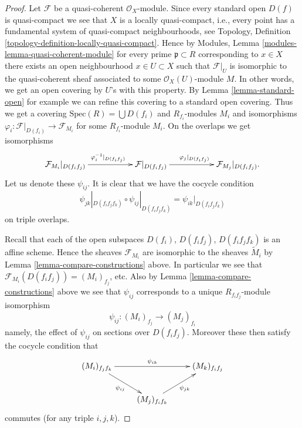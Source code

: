 \begin{proof}
Let $\mathcal{F}$ be a quasi-coherent $\mathcal{O}_X$-module.
Since every standard open $D(f)$ is quasi-compact we see that
$X$ is a locally quasi-compact, i.e., every point has a fundamental
system of quasi-compact neighbourhoods, see Topology,
Definition \ref{topology-definition-locally-quasi-compact}.
Hence by Modules, Lemma \ref{modules-lemma-quasi-coherent-module}
for every prime $\mathfrak p \subset R$ corresponding to $x \in X$
there exists an open neighbourhood $x \in U \subset X$ such that
$\mathcal{F}|_U$ is isomorphic to the quasi-coherent
sheaf associated to some $\mathcal{O}_X(U)$-module $M$.
In other words, we get an open covering by $U$'s with this property.
By Lemma \ref{lemma-standard-open} for example we can refine this
covering to  a standard open covering.
Thus we get a covering $\text{Spec}(R) = \bigcup D(f_i)$
and $R_{f_i}$-modules $M_i$ and isomorphisms
$\varphi_i : \mathcal{F}|_{D(f_i)} \to \mathcal{F}_{M_i}$
for some $R_{f_i}$-module $M_i$. On the overlaps
we get isomorphisms
$$
\xymatrix{
\mathcal{F}_{M_i}|_{D(f_if_j)}
\ar[rr]^{\varphi_i^{-1}|_{D(f_if_j)}}
& &
\mathcal{F}|_{D(f_if_j)}
\ar[rr]^{\varphi_j|_{D(f_if_j)}}
& &
\mathcal{F}_{M_j}|_{D(f_if_j)}.
}
$$
Let us denote these $\psi_{ij}$. It is clear that
we have the cocycle condition
$$
\psi_{jk}|_{D(f_if_jf_k)}
\circ 
\psi_{ij}|_{D(f_if_jf_k)}
=
\psi_{ik}|_{D(f_if_jf_k)}
$$
on triple overlaps.

\medskip\noindent
Recall that each of the open subspaces $D(f_i)$, $D(f_if_j)$,
$D(f_if_jf_k)$ is an affine scheme. Hence the sheaves $\mathcal{F}_{M_i}$
are isomorphic to the sheaves $\widetilde M_i$ by Lemma
\ref{lemma-compare-constructions} above. In particular we see that
$\mathcal{F}_{M_i}(D(f_if_j)) = (M_i)_{f_j}$, etc.
Also by Lemma \ref{lemma-compare-constructions} above we see
that $\psi_{ij}$ corresponds to a unique $R_{f_if_j}$-module isomorphism
$$
\psi_{ij} : (M_i)_{f_j} \longrightarrow (M_j)_{f_i}
$$
namely, the effect of $\psi_{ij}$ on sections over $D(f_if_j)$.
Moreover these then satisfy the cocycle condition that
$$
\xymatrix{
(M_i)_{f_jf_k}
\ar[rd]_{\psi_{ij}}
\ar[rr]^{\psi_{ik}}
& &
(M_k)_{f_if_j} \\
&
(M_j)_{f_if_k} \ar[ru]_{\psi_{jk}}
}
$$
commutes (for any triple $i, j, k$).


\end{proof}
